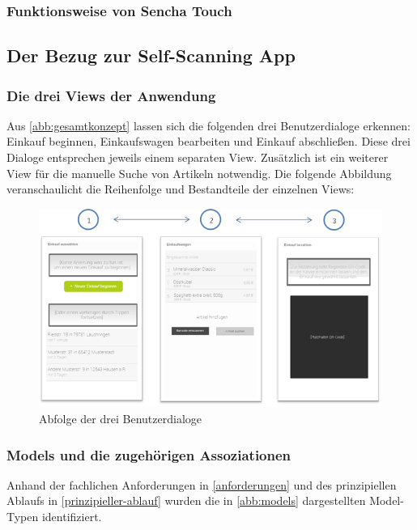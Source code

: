 \subsubsection*{Funktionsweise von Sencha Touch}

\subsection{Der Bezug zur Self-Scanning App}
\subsubsection*{Die drei Views der Anwendung}
Aus \vref{abb:gesamtkonzept} lassen sich die folgenden drei Benutzerdialoge erkennen: Einkauf beginnen, Einkaufswagen bearbeiten und Einkauf abschließen. Diese drei Dialoge entsprechen jeweils einem separaten View. Zusätzlich ist ein weiterer View für die manuelle Suche von Artikeln notwendig. Die folgende Abbildung veranschaulicht die Reihenfolge und Bestandteile der einzelnen Views:

\begin{figure}[H]
\includegraphics[width=\linewidth]{res/views.png}
\caption{Abfolge der drei Benutzerdialoge}
\end{figure}

\subsubsection*{Models und die zugehörigen Assoziationen}
Anhand der fachlichen Anforderungen in \ref{anforderungen} und des prinzipiellen Ablaufs in \ref{prinzipieller-ablauf} wurden die in \ref{abb:models} dargestellten Model-Typen identifiziert.

